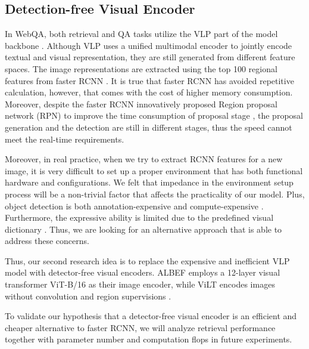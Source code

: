 \documentclass[nohyperref]{article}
\theoremstyle{plain}
\theoremstyle{definition}
\theoremstyle{remark}
\begin{document}
\subsection{Detection-free Visual Encoder}\label{sec:detection_free_encoder_idea}
In WebQA, both retrieval and QA tasks utilize the VLP part of the model backbone \cite{webqa}. Although VLP uses a unified multimodal encoder to jointly encode textual and visual representation, they are still generated from different feature spaces. The image representations are extracted using the top 100 regional features from faster RCNN \cite{rcnn}. It is true that faster RCNN has avoided repetitive calculation, however, that comes with the cost of higher memory consumption. Moreover, despite the faster RCNN innovatively proposed Region proposal network (RPN) to improve the time consumption of proposal stage \cite{rcnn}, the proposal generation and the detection are still in different stages, thus the speed cannot meet the real-time requirements.

Moreover, in real practice, when we try to extract RCNN features for a new image, it is very difficult to set up a proper environment that has both functional hardware and configurations. We felt that impedance in the environment setup process will be a non-trivial factor that affects the practicality of our model. Plus, object detection is both annotation-expensive and compute-expensive \cite{albef}. Furthermore, the expressive ability is limited due to the predefined visual dictionary \cite{vilt}. Thus, we are looking for an alternative approach that is able to address these concerns.

Thus, our second research idea is to replace the expensive and inefficient VLP model with detector-free visual encoders. ALBEF employs a 12-layer visual transformer ViT-B/16 \cite{vit} as their image encoder, while ViLT encodes images without convolution and region supervisions \cite{vilt}.

To validate our hypothesis that a detector-free visual encoder is an efficient and cheaper alternative to faster RCNN, we will analyze retrieval performance together with parameter number and computation flops in future experiments.
\end{document}
